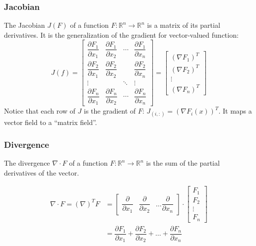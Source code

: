 \documentclass{article}
\begin{document}
\subsubsection{Jacobian}
The Jacobian $J(F)$ of a function $ F: \mathbb{R}^n \longrightarrow \mathbb{R}^n $
is a matrix of its partial derivatives. It is the generalization of the gradient
for vector-valued function:
\[
    J(f)=
    \begin{bmatrix}
        \dfrac{\partial F_1}{\partial x_1} &
        \dfrac{\partial F_1}{\partial x_2} &
        \cdots &
        \dfrac{\partial F_1}{\partial x_n} \\ 
        \dfrac{\partial F_2}{\partial x_1} &
        \dfrac{\partial F_2}{\partial x_2} &   &
        \dfrac{\partial F_2}{\partial x_n} \\ 
        \vdots &  & \ddots & \vdots \\ 
        \dfrac{\partial F_n}{\partial x_1} &
        \dfrac{\partial F_n}{\partial x_2} &
        \cdots &
        \dfrac{\partial F_n}{\partial x_n}
    \end{bmatrix} = 
    \begin{bmatrix}
        (\nabla F_1)^T \\ (\nabla F_2)^T  \\ \vdots \\ (\nabla F_n)^T 
    \end{bmatrix} 
\]
Notice that each row of $J$ is the gradient of $F$: $J_{(i, :)} = (\nabla
F_i(x))^T $. It maps a vector field to a ``matrix field''.
\subsubsection{Divergence}
The divergence $\nabla \cdot F$ of a function $ F: \mathbb{R}^n \longrightarrow
\mathbb{R}^n $ is the sum of the partial derivatives of the vector.

\begin{align*}
\nabla \cdot F = (\nabla)^T  F &=
\begin{bmatrix}
        \dfrac{\partial }{\partial x_1} & 
        \dfrac{\partial }{\partial x_2} &
        \hdots
        \dfrac{\partial }{\partial x_n}
    \end{bmatrix} \cdot
    \begin{bmatrix}
        F_1 \\
        F_2 \\
        \vdots \\
        F_n
    \end{bmatrix} \\ &=  
    \dfrac{\partial F_1}{\partial x_1} + 
    \dfrac{\partial F_2}{\partial x_2} + 
    \hdots +
    \dfrac{\partial F_n}{\partial x_n}
\end{align*}
\end{document}

